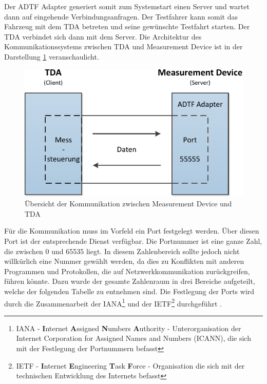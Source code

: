 \documentclass[12pt,a4paper]{report}
\begin{document}
Der ADTF Adapter generiert somit zum Systemstart einen Server und wartet dann auf eingehende Verbindungsanfragen. Der Testfahrer kann somit das Fahrzeug mit dem TDA betreten und seine gewünschte Testfahrt starten. Der TDA verbindet sich dann mit dem Server. Die Architektur des Kommunikationssystems zwischen TDA und Measurement Device ist in der Darstellung \ref{pic:Uebersicht Kommunikation} veranschaulicht. 
\begin{figure}
\includegraphics[width=1\linewidth]{Darstellungen/UebersichtKommunikationCaptureDevice}
\caption{Übersicht der Kommunikation zwischen Measurement Device und TDA}\label{pic:Uebersicht Kommunikation}
\end{figure}
Für die Kommunikation muss im Vorfeld ein Port festgelegt werden. Über diesen Port ist der entsprechende Dienst verfügbar. Die Portnummer ist eine ganze Zahl, die zwischen 0 und 65535 liegt. In diesem Zahlenbereich sollte jedoch nicht willkürlich eine Nummer gewählt werden, da dies zu Konflikten mit anderen Programmen und Protokollen, die auf Netzwerkkommunikation zurückgreifen, führen könnte. Dazu wurde der gesamte Zahlenraum in drei Bereiche aufgeteilt, welche der folgenden Tabelle zu entnehmen sind. Die Festlegung der Ports wird durch die Zusammenarbeit 	der IANA\footnote{IANA - \textbf{I}nternet \textbf{A}ssigned \textbf{N}umbers \textbf{A}uthority - Unterorganisation der Internet Corporation for Assigned Names and Numbers (ICANN), die sich mit der Festlegung der Portnummern befasst} und der IETF\footnote{IETF - \textbf{I}nternet \textbf{E}ngineering \textbf{T}ask \textbf{F}orce - Organisation die sich mit der technischen Entwicklung des Internets befasst} durchgeführt \cite{WikipediaPort}.
\end{document}
